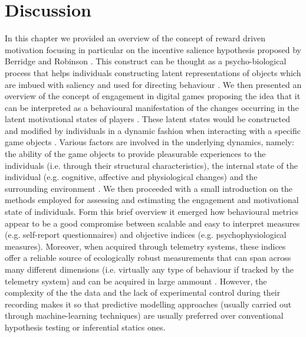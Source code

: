 \section{Discussion}
\label{discussion_litreview}
In this chapter we provided an overview of the concept of reward driven motivation focusing in particular on the incentive salience hypothesis proposed by Berridge and Robinson \cite{berridge1998role}. This construct can be thought as a psycho-biological process that helps individuals constructing latent representations of objects which are imbued with saliency and used for directing behaviour \cite{berridge2004motivation}. We then presented an overview of the concept of engagement in digital games proposing the idea that it can be interpreted as a behavioural manifestation of the changes occurring in the latent motivational states of players \cite{o2008user,berridge2004motivation}. These latent states would be constructed and modified by individuals in a dynamic fashion when interacting with a specific game objects \cite{o2008user,berridge2004motivation}. Various factors are involved in the underlying dynamics, namely: the ability of the game objects to provide pleasurable experiences to the individuals (i.e. through their structural characteristics), the internal state of the individual (e.g. cognitive, affective and physiological changes) and the surrounding environment \cite{lucas2004sex,o2008user,jennett2008measuring,boyle2012engagement,connolly2012systematic,berridge2004motivation,csikszentmihalyi2014toward}. We then proceeded with a small introduction on the methods employed for assessing and estimating the engagement and motivational state of individuals. Form this brief overview it emerged how behavioural metrics appear to be a good compromise between scalable and easy to interpret measures (e.g. self-report questionnaires) and objective indices (e.g. psychophysiological measures). Moreover, when acquired through telemetry systems, these indices offer a reliable source of ecologically robust measurements that can span across many different dimensions (i.e. virtually any type of behaviour if tracked by the telemetry system) and can be acquired in large ammount \cite{el2016game}. However, the complexity of the the data and the lack of experimental control during their recording makes it so that predictive modelling approaches (usually carried out through machine-learning techniques) are usually preferred over conventional hypothesis testing or inferential statics ones.  

